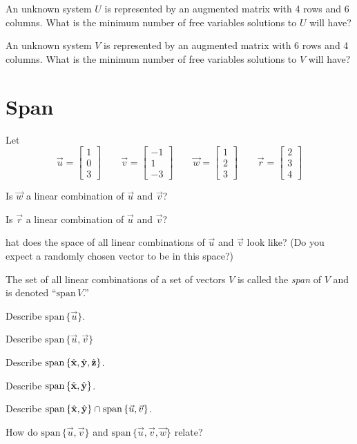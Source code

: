 \documentclass{article}
\newcommand{\xh}{\hat{\bf x}}
\newcommand{\yh}{\hat{\bf y}}
\newcommand{\zh}{\hat{\bf z}}
\renewcommand{\span}{\mathrm{span}\,}
\newcommand{\mat}[1]{\begin{bmatrix}#1\end{bmatrix}}
\begin{document}
	\begin{Enum}
		\item An unknown system $U$ is represented by an augmented
		matrix with 4 rows and 6 columns.  What is 
		the minimum number of
		free variables solutions to $U$ will have?
		\item An unknown system $V$ is represented by an augmented
		matrix with 6 rows and 4 columns.  What is 
		the minimum number of
		free variables solutions to $V$ will have?
	\end{Enum}

\section*{Span}
	Let
	\[
		\vec u=\mat{1\\0\\3} \qquad \vec v=\mat{-1\\1\\-3}
		\qquad \vec w=\mat{1\\2\\3} \qquad \vec r=\mat{2\\3\\4}
	\]

	\begin{Enum}
		\item Is $\vec w$ a linear combination of $\vec u$ and $\vec v$?
		\item Is $\vec r$ a linear combination of $\vec u$ and $\vec v$?
		\item hat does the space of all linear combinations of 
		$\vec u$ and $\vec v$ look like? (Do you expect a randomly 
		chosen vector to be in this space?)
	\end{Enum}

	The set of all linear combinations of a set of vectors $V$ is called
	the \emph{span} of $V$ and is denoted ``$\span V$.''
	\begin{Enum}
		\item Describe $\span\{\vec u\}$.
		\item Describe $\span\{\vec u,\vec v\}$
		\item Describe $\span\{\xh,\yh,\zh\}$.
		\item Describe $\span\{\xh,\yh\}$.
		\item Describe $\span\{\xh,\yh\}\cap \span\{\vec u,\vec v\}$.
	\end{Enum}
	\begin{Enum}
		\item How do $\span\{\vec u,\vec v\}$ and
		$\span\{\vec u,\vec v,\vec w\}$ relate?
	\end{Enum}
\end{document}
